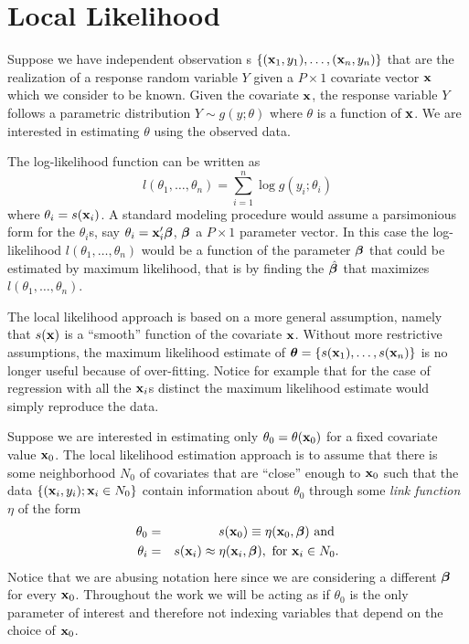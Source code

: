 \section{Local Likelihood}

Suppose we have independent observation s
$\{ ({\mathbf x}_1,y_1),\dots,({\mathbf x}_n,y_n) \}$ that are the
realization of a response random variable $Y$ given a 
$P \times 1$ covariate vector ${\mathbf x}$ which we  consider to be
known. Given the 
covariate ${\mathbf x}$, the  response variable $Y$
follows a parametric 
distribution  
$Y \sim g(y; \theta)$ where $\theta$ is a function of ${\mathbf x}$. 
We are interested in estimating $\theta$ using the observed data. 

The log-likelihood function can be written as  
\begin{equation}
\label{llf}
l(\theta_1,\dots,\theta_n) = \sum_{i=1}^n \log g(y_i; \theta_i)
\end{equation}
where $\theta_i = s({\mathbf x}_i)$. A standard modeling procedure
would assume 
a parsimonious form  for 
the $\theta_i$s, say $\theta_i = {\mathbf x}_i'\mbox{\boldmath $\beta$\unboldmath}$,
$\mbox{\boldmath $\beta$\unboldmath}$ a $P \times 1$ parameter vector. In this case the log-likelihood
$l(\theta_1,\dots,\theta_n)$ would be  a function of the
parameter $\mbox{\boldmath $\beta$\unboldmath}$ that could be estimated by maximum
likelihood, that is by finding the $\hat{\mbox{\boldmath $\beta$\unboldmath}\:}\!$ that maximizes 
$l(\theta_1,\dots,\theta_n)$. 

The local likelihood approach is based on a more general assumption,
namely that  $s({\mathbf x})$ is a ``smooth'' function of the
covariate ${\mathbf x}$. 
Without more restrictive assumptions, the maximum likelihood estimate of 
$\mbox{\boldmath $\theta$\unboldmath}=\{s({\mathbf x}_1),\dots,s({\mathbf x}_n)\} $ is no
longer useful because of over-fitting. Notice for example that for the
case of regression with all the ${\mathbf x}_i$s distinct the maximum likelihood estimate  would simply
reproduce the data. 
 
Suppose we are interested in estimating only
$\theta_{0} = \theta({\mathbf x}_0)$ for a fixed covariate value ${\mathbf x}_0$.   
The local likelihood estimation approach is to assume that 
there is some neighborhood $N_0$ of covariates that are ``close''
enough to
${\mathbf x}_0$ such that the
 data $\{ ({\mathbf x}_i,y_i) ; {\mathbf x}_i \in N_0\}$ contain  
information about $\theta_0$ through some {\sl link function} $\eta$ of the
form  
\begin{eqnarray}
\label{etadef}
\theta_0 &=& s({\mathbf x}_0) \equiv \eta({\mathbf x}_0, \mbox{\boldmath $\beta$\unboldmath}) \mbox
{ and }\\
\label{etadef2}
\theta_i &=& s({\mathbf x}_i) \approx \eta({\mathbf x}_i,\mbox{\boldmath $\beta$\unboldmath}), \mbox
{ for } {\mathbf x}_i \in N_0 .
\end{eqnarray}
Notice that we are abusing notation here since we are considering a
different $\mbox{\boldmath $\beta$\unboldmath}$ for every ${\mathbf x}_0$. Throughout the work we will be
acting as if $\theta_0$ is the only parameter of interest and
therefore not indexing variables that depend on the choice of
${\mathbf x}_0$. 

